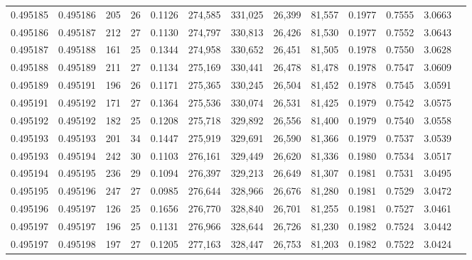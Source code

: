 \begin{tabular}{rrrrrrrrrrrrr}
0.495185 & 0.495186 & 205 &  26 &                                     0.1126 & 274,585 & 331,025 &  26,399 &  81,557 & 0.1977 & 0.7555 & 3.0663 \\
0.495186 & 0.495187 & 212 &  27 &                                     0.1130 & 274,797 & 330,813 &  26,426 &  81,530 & 0.1977 & 0.7552 & 3.0643 \\
0.495187 & 0.495188 & 161 &  25 &                                     0.1344 & 274,958 & 330,652 &  26,451 &  81,505 & 0.1978 & 0.7550 & 3.0628 \\
0.495188 & 0.495189 & 211 &  27 &                                     0.1134 & 275,169 & 330,441 &  26,478 &  81,478 & 0.1978 & 0.7547 & 3.0609 \\
0.495189 & 0.495191 & 196 &  26 &                                     0.1171 & 275,365 & 330,245 &  26,504 &  81,452 & 0.1978 & 0.7545 & 3.0591 \\
0.495191 & 0.495192 & 171 &  27 &                                     0.1364 & 275,536 & 330,074 &  26,531 &  81,425 & 0.1979 & 0.7542 & 3.0575 \\
0.495192 & 0.495192 & 182 &  25 &                                     0.1208 & 275,718 & 329,892 &  26,556 &  81,400 & 0.1979 & 0.7540 & 3.0558 \\
0.495193 & 0.495193 & 201 &  34 &                                     0.1447 & 275,919 & 329,691 &  26,590 &  81,366 & 0.1979 & 0.7537 & 3.0539 \\
0.495193 & 0.495194 & 242 &  30 &                                     0.1103 & 276,161 & 329,449 &  26,620 &  81,336 & 0.1980 & 0.7534 & 3.0517 \\
0.495194 & 0.495195 & 236 &  29 &                                     0.1094 & 276,397 & 329,213 &  26,649 &  81,307 & 0.1981 & 0.7531 & 3.0495 \\
0.495195 & 0.495196 & 247 &  27 &                                     0.0985 & 276,644 & 328,966 &  26,676 &  81,280 & 0.1981 & 0.7529 & 3.0472 \\
0.495196 & 0.495197 & 126 &  25 &                                     0.1656 & 276,770 & 328,840 &  26,701 &  81,255 & 0.1981 & 0.7527 & 3.0461 \\
0.495197 & 0.495197 & 196 &  25 &                                     0.1131 & 276,966 & 328,644 &  26,726 &  81,230 & 0.1982 & 0.7524 & 3.0442 \\
0.495197 & 0.495198 & 197 &  27 &                                     0.1205 & 277,163 & 328,447 &  26,753 &  81,203 & 0.1982 & 0.7522 & 3.0424 \\

\end{tabular}
